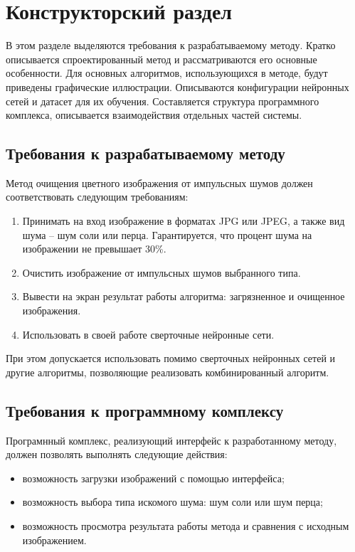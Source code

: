 \section{Конструкторский раздел}
В этом разделе выделяются требования к разрабатываемому методу.
Кратко описывается спроектированный метод и рассматриваются его основные особенности.
Для основных алгоритмов, использующихся в методе, будут приведены графические иллюстрации.
Описываются конфигурации нейронных сетей и датасет для их обучения.
Составляется структура программного комплекса, описывается взаимодействия отдельных частей системы. 

\subsection{Требования к разрабатываемому методу}
Метод очищения цветного изображения от импульсных шумов должен соответствовать следующим требованиям:
\begin{enumerate}
	\item Принимать на вход изображение в форматах JPG или JPEG, а также вид шума -- шум соли или перца. 
	Гарантируется, что процент шума на изображении не превышает 30\%.
	\item Очистить изображение от импульсных шумов выбранного типа.
	\item Вывести на экран результат работы алгоритма: загрязненное и очищенное изображения.
	\item Использовать в своей работе сверточные нейронные сети.
\end{enumerate}

При этом допускается использовать помимо сверточных нейронных сетей и другие алгоритмы, позволяющие реализовать комбинированный алгоритм.

\subsection{Требования к программному комплексу}
Програмнный комплекс, реализующий интерфейс к разработанному методу, должен позволять выполнять следующие действия:
\begin{itemize}
	\item возможность загрузки изображений с помощью интерфейса;
	\item возможность выбора типа искомого шума: шум соли или шум перца;
	\item возможность просмотра результата работы метода и сравнения с исходным изображением.
\end{itemize}

